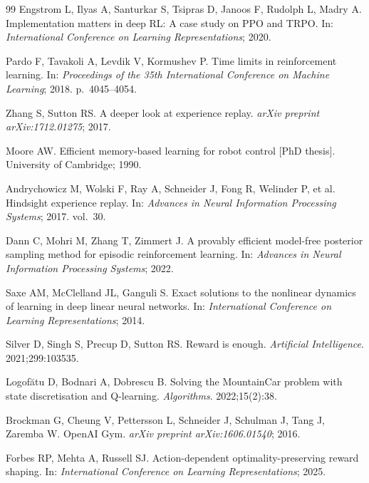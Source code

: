 \documentclass[a4paper,12pt]{article}
\begin{document}
\begin{thebibliography}{99}
Engstrom L, Ilyas A, Santurkar S, Tsipras D, Janoos F, Rudolph L, Madry A.
Implementation matters in deep RL: A case study on PPO and TRPO.
In: \textit{International Conference on Learning Representations}; 2020.

Pardo F, Tavakoli A, Levdik V, Kormushev P.
Time limits in reinforcement learning.
In: \textit{Proceedings of the 35th International Conference on Machine Learning}; 2018. p.~4045--4054.

Zhang S, Sutton RS.
A deeper look at experience replay.
\textit{arXiv preprint arXiv:1712.01275}; 2017.

Moore AW.
Efficient memory-based learning for robot control [PhD thesis].
University of Cambridge; 1990.

Andrychowicz M, Wolski F, Ray A, Schneider J, Fong R, Welinder P, et al.
Hindsight experience replay.
In: \textit{Advances in Neural Information Processing Systems}; 2017. vol.~30.

Dann C, Mohri M, Zhang T, Zimmert J.
A provably efficient model-free posterior sampling method for episodic reinforcement learning.
In: \textit{Advances in Neural Information Processing Systems}; 2022.

Saxe AM, McClelland JL, Ganguli S.
Exact solutions to the nonlinear dynamics of learning in deep linear neural networks.
In: \textit{International Conference on Learning Representations}; 2014.

Silver D, Singh S, Precup D, Sutton RS.
Reward is enough.
\textit{Artificial Intelligence}. 2021;299:103535.

Logof\u{a}tu D, Bodnari A, Dobrescu B.
Solving the MountainCar problem with state discretisation and Q-learning.
\textit{Algorithms}. 2022;15(2):38.

Brockman G, Cheung V, Pettersson L, Schneider J, Schulman J, Tang J, Zaremba W.
OpenAI Gym.
\textit{arXiv preprint arXiv:1606.01540}; 2016.

Forbes RP, Mehta A, Russell SJ.
Action-dependent optimality-preserving reward shaping.
In: \textit{International Conference on Learning Representations}; 2025.

\end{thebibliography}
\end{document}
